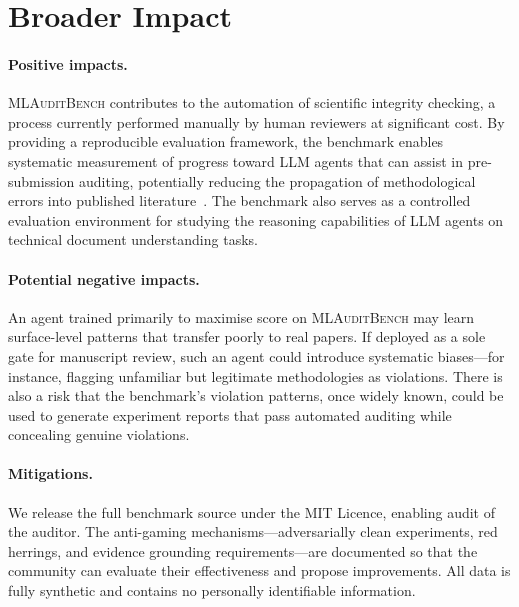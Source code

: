 \documentclass{article}
\begin{document}
\section*{Broader Impact}
\label{sec:impact}

\paragraph{Positive impacts.}
\textsc{MLAuditBench} contributes to the automation of scientific integrity checking, a process currently performed manually by human reviewers at significant cost.
By providing a reproducible evaluation framework, the benchmark enables systematic measurement of progress toward LLM agents that can assist in pre-submission auditing, potentially reducing the propagation of methodological errors into published literature~\citep{kapoor2023leakage}.
The benchmark also serves as a controlled evaluation environment for studying the reasoning capabilities of LLM agents on technical document understanding tasks.

\paragraph{Potential negative impacts.}
An agent trained primarily to maximise score on \textsc{MLAuditBench} may learn surface-level patterns that transfer poorly to real papers.
If deployed as a sole gate for manuscript review, such an agent could introduce systematic biases---for instance, flagging unfamiliar but legitimate methodologies as violations.
There is also a risk that the benchmark's violation patterns, once widely known, could be used to generate experiment reports that pass automated auditing while concealing genuine violations.

\paragraph{Mitigations.}
We release the full benchmark source under the MIT Licence, enabling audit of the auditor.
The anti-gaming mechanisms---adversarially clean experiments, red herrings, and evidence grounding requirements---are documented so that the community can evaluate their effectiveness and propose improvements.
All data is fully synthetic and contains no personally identifiable information.

\end{document}
